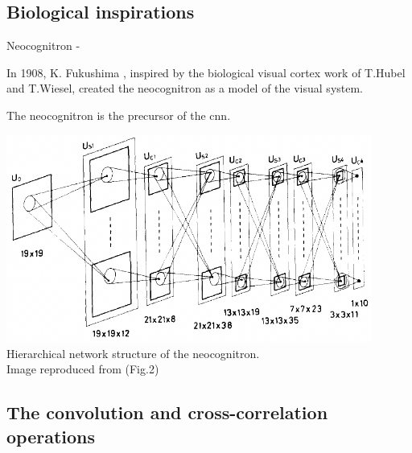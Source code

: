 \subsection{Biological inspirations}


%
%
%

\begin{frame}[t,allowframebreaks]{Neocognitron -}

    In 1908, K. Fukushima \cite{Fukushima:1980nc, Fukushima:1988nc}, 
    inspired by the biological visual cortex work of T.Hubel and T.Wiesel,
    created the \gls{neocognitron}
    as a model of the visual system.

    The \gls{neocognitron} is the precursor of the \gls{cnn}.

    \framebreak

    \begin{center}
        \includegraphics[width=0.90\textwidth]
           {./images/neocognitron/fukushima88_hierarchical_network_structure_01.png}\\
        Hierarchical network structure of the \gls{neocognitron}.\\
        {\scriptsize \color{col:attribution} 
        Image reproduced from \cite{Fukushima:1988nc} (Fig.2)}\\
    \end{center}

\end{frame}

%
%
%

\subsection{The convolution and cross-correlation operations}


